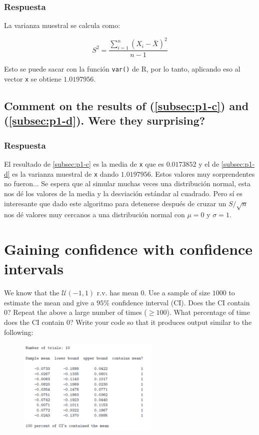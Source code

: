 \documentclass[12pt]{article}\usepackage[]{graphicx}\usepackage[]{xcolor}
\begin{document}
\subsubsection{Respuesta}

La varianza muestral se calcula como:

\[
S^{2} = \frac{\sum_{i=1}^{n} (X_{i} - \bar{X})^{2}}{n-1}
\]

Esto se puede sacar con la función \lstinline|var()| de \textsf{R}, por lo tanto, aplicando eso al vector \lstinline|x| se obtiene $1.0197956$.



\subsection{Comment on the results of (\ref{subsec:p1-c}) and (\ref{subsec:p1-d}). Were they surprising?}
\label{subsec:p1-e}

\subsubsection{Respuesta}

El resultado de \ref{subsec:p1-c} es la media de \lstinline|x| que es $0.0173852$ y el de \ref{subsec:p1-d} es la varianza muestral de \lstinline|x| dando $1.0197956$. Estos valores muy sorprendentes no fueron... Se espera que al simular muchas veces una distribución normal, esta nos dé los valores de la media y la desviación estándar al cuadrado. Pero sí es interesante que dado este algoritmo para detenerse después de cruzar un $S / \sqrt{n}$ nos dé valores muy cercanos a una distribución normal con $\mu = 0$ y $\sigma = 1$.



\section{Gaining confidence with confidence intervals}

We know that the $\mathcal{U}(-1, 1)$ r.v. has mean 0. Use a sample of size $1000$ to estimate the mean and give a $95\%$ confidence interval (CI). Does the CI contain 0? Repeat the above a large number of times ($\geq  100$). What percentage of time does the CI contain 0? Write your code so that it produces output similar to the following:


\begin{figure}[ht]
  \centering
  \includegraphics[width=0.6\textwidth]{img/Punto2.png}
\end{figure}
\end{document}

